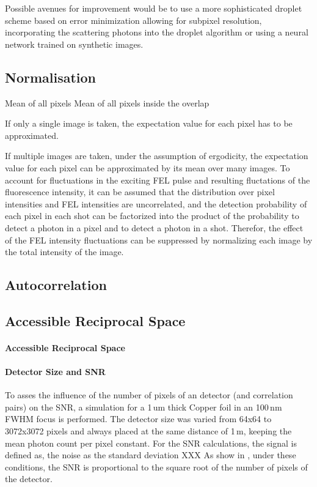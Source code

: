Possible avenues for improvement would be to use a more sophisticated droplet scheme based on error minimization allowing for subpixel resolution, incorporating the scattering photons into the droplet algorithm or using a neural network trained on synthetic images.




\subsection{Normalisation}
Mean of all pixels 
Mean of all pixels inside the overlap

If only a single image is taken, the expectation value for each pixel has to be approximated.

If multiple images are taken, under the assumption of ergodicity, the expectation value for each pixel can be approximated by its mean over many images. To account for fluctuations in the exciting FEL pulse and resulting fluctations of the fluorescence intensity, it can be assumed that the distribution over pixel intensities and FEL intensities are uncorrelated, and the detection probability of each pixel in each shot can be factorized into the product of the probability to detect a photon in a pixel and to detect a photon in a shot. Therefor, the effect of the FEL intensity fluctuations can be suppressed by normalizing each image by the total intensity of the image.



\subsection{Autocorrelation}

\subsection{Accessible Reciprocal Space}
	\paragraph{Accessible Reciprocal Space}
	\paragraph{Detector Size and SNR}
	
	To asses the influence of the number of pixels of an detector (and correlation pairs) on the SNR, a simulation for a 1\,um thick Copper foil in an 100\,nm FWHM focus is performed. The detector size was varied from 64x64 to 3072x3072 pixels and always placed at the same distance of 1\,m, keeping the mean photon count per pixel constant. For the SNR calculations, the signal is defined as, the noise as the standard deviation XXX
	As show in , under these conditions, the SNR is proportional to the square root of the number of pixels of the detector.



